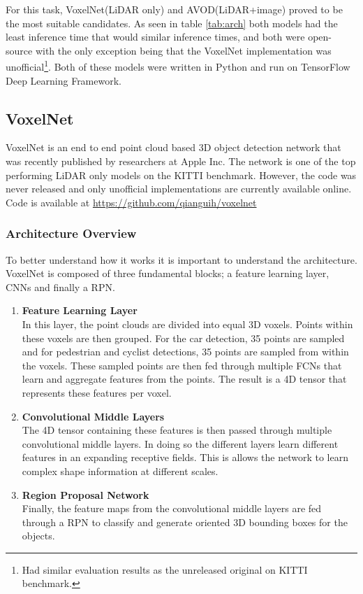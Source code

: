 For this task, VoxelNet(LiDAR only) and AVOD(LiDAR+image) proved to be the most suitable candidates. As seen in table \ref{tab:arch} both models had the least inference time that would similar inference times, and both were open-source with the only exception being that the VoxelNet implementation was unofficial\footnote{Had similar evaluation results as the unreleased original on KITTI benchmark.}. Both of these models were written in Python and run on TensorFlow Deep Learning Framework.


\subsection{VoxelNet}
VoxelNet is an end to end point cloud based 3D object detection network that was recently  published by researchers at Apple Inc. The network is one of the top performing LiDAR only models on the KITTI benchmark. However, the code was never released and only unofficial implementations are currently available online.
Code is available at \url{https://github.com/qianguih/voxelnet}
\subsubsection{Architecture Overview}
To better understand how it works it is important to understand the architecture. VoxelNet is composed of three fundamental blocks; a feature learning layer, CNNs and finally a RPN. 
\begin{enumerate}
	\item \textbf{Feature Learning Layer} \\ 
	In this layer, the point clouds are divided into equal 3D voxels. Points within these voxels are then grouped. For the car detection, 35 points are sampled and for pedestrian and cyclist detections, 35 points are sampled from within the voxels. These sampled points are then fed through multiple FCNs that learn and aggregate features from the points. The result is a 4D tensor that represents these features per voxel.
	
	\item \textbf{Convolutional Middle Layers} \\ 
	The 4D tensor containing these features is then passed through multiple convolutional middle layers. In doing so the different layers learn different features in an expanding receptive fields. This is allows the network to learn complex shape information at different scales. 
	\item \textbf{Region Proposal Network} \\ 
	Finally, the feature maps from the convolutional middle layers are fed through a RPN to classify and generate  oriented 3D bounding boxes for the objects. 
	
\end{enumerate}

